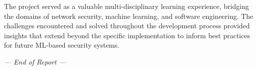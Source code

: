 \documentclass[12pt,a4paper,twoside]{report}
\begin{document}
The project served as a valuable multi-disciplinary learning experience, bridging the domains of network security, machine learning, and software engineering. The challenges encountered and solved throughout the development process provided insights that extend beyond the specific implementation to inform best practices for future ML-based security systems.

\vspace{20pt}

\begin{center}
\textit{--- End of Report ---}
\end{center}
\end{document}

